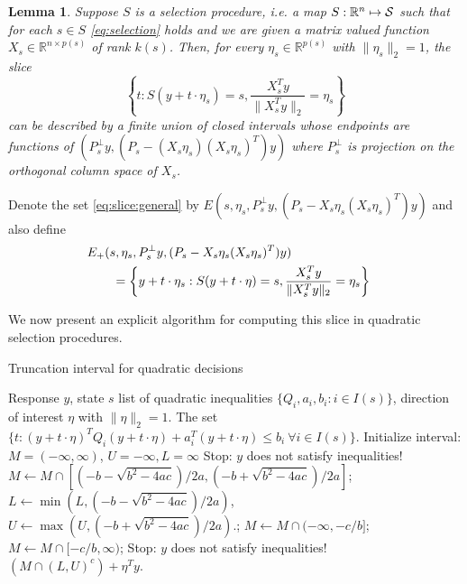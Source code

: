 \documentclass{imsart}
\newcommand{\real}{\mathbb{R}}
\newtheorem{lemma}[theorem]{Lemma}
\begin{document}
\begin{lemma}
Suppose $S$ is a selection procedure, i.e. a map $S:\real^n \mapsto {\cal S}$
such that for each $s \in S$ \eqref{eq:selection} holds 
and we are given a matrix valued function $X_s \in \real^{n \times p(s)}$ of rank
$k(s)$.
Then, for every $\eta_s \in \real^{p(s)}$ with $\|\eta_s\|_2=1$, the
slice
\begin{equation}
\label{eq:slice:general}
\left\{t: S(y+t \cdot \eta_s)=s, \frac{X_s^Ty}{\|X_s^Ty\|_2}=\eta_s \right\}
\end{equation}
can be described by
a finite union of closed intervals whose endpoints are functions of 
$(P_s^{\perp}y, (P_s- (X_s\eta_s)(X_s\eta_s)^T)y)$ where
$P_s^{\perp}$ is projection on the orthogonal column space of $X_s$.
\end{lemma}
Denote the set \eqref{eq:slice:general} by $E(s, \eta_s, P_s^{\perp}y, (P_s - X_s \eta_s(X_s\eta_s)^T)y)$ and also define
$$
\begin{aligned}
\lefteqn{
E_+(s, \eta_s, P_s^{\perp}y, (P_s - X_s \eta_s(X_s\eta_s)^T)y) } \\
 & \qquad = \left\{y + t \cdot \eta_s: S(y+t \cdot \eta)=s, \frac{X_s^Ty}{\|X_s^Ty\|_2}=\eta_s \right\} \\
\end{aligned}
$$

We now present an explicit algorithm for computing this slice in quadratic selection procedures.

\begin{algorithm}
 \caption{Truncation interval for quadratic decisions}
 \label{algo:quadratic}
 \begin{algorithmic}
   \REQUIRE Response $y$, state $s$ list of quadratic inequalities $\{Q_i, a_i, b_i: i \in I(s)\}$, direction
   of interest $\eta$ with $\|\eta\|_2=1$.
   \ENSURE The set $\{t: (y+t \cdot \eta)^TQ_i(y+t \cdot \eta) + a_i^T(y+t \cdot \eta) \leq b_i  \ \forall i \in I(s) \}$.
      \STATE Initialize  interval: $M= (-\infty,\infty)$, $U=-\infty, L=\infty$
    \STATE Stop: $y$ does not satisfy inequalities!
     \STATE $M \gets M \cap [(-b-\sqrt{b^2-4ac})/2a, (-b+\sqrt{b^2-4ac})/2a]$;
     \STATE $L \gets \min(L,(-b-\sqrt{b^2-4ac})/2a)$,
     \STATE $U \gets \max(U,(-b+\sqrt{b^2-4ac})/2a).$;
    \ENDIF
    \ELSE
   \STATE $M \gets M \cap (-\infty, -c/b]$;
   \STATE $M \gets M \cap [-c/b,\infty)$;
   \STATE Stop: $y$ does not satisfy inequalities!
   \ENDIF
   \ENDIF
   \ENDFOR
   \RETURN $(M \cap (L,U)^c) + \eta^Ty.$
 \end{algorithmic}
\end{algorithm}
\end{document}
